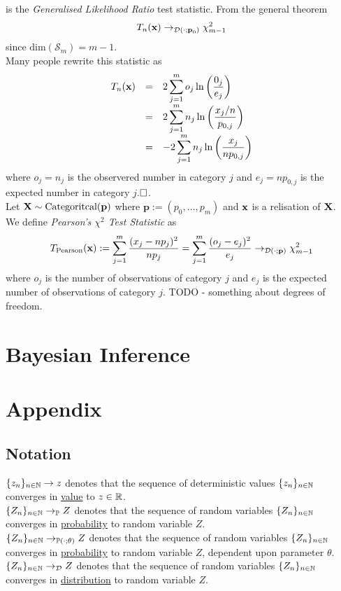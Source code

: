 \documentclass[11pt,a4paper]{article}
\begin{document}
is the \textit{Generalised Likelihood Ratio} test statistic. From the general theorem
$$T_n(\textbf{x})\to_{\mathcal{D}(\cdot;\textbf{p}_0)}\chi^2_{m-1}$$
since $\text{dim}(\mathcal{S}_m)=m-1$.\\
Many people rewrite this statistic as
\[\begin{array}{rcl}
T_n(\textbf{x})&=&{\displaystyle2\sum_{j=1}^mo_j\ln\left(\frac{0_j}{e_j}\right)}\\
&=&{\displaystyle2\sum_{j=1}^mn_j\ln\left(\frac{x_j/n}{p_{0,j}}\right)}\\
&=&{\displaystyle-2\sum_{j=1}^mn_j\ln\left(\frac{x_j}{np_{0,j}}\right)}
\end{array}\]
where $o_j=n_j$ is the observered number in category $j$ and $e_j=np_{0,j}$ is the expected number in category $j$.$\hfill\square$.\\

Let $\textbf{X}\sim\text{Categoritcal}(\textbf{p})$ where $\textbf{p}:=(p_0,\dots,p_m)$ and $\textbf{x}$ is a relisation of $\textbf{X}$.\\
We define \textit{Pearson's $\chi^2$ Test Statistic}  as
$$T_\text{Pearson}(\textbf{x}):=\sum_{j=1}^m\frac{(x_j-np_{j})^2}{np_{j}}=\sum_{j=1}^m\frac{(o_j-e_j)^2}{e_j}\to_{\mathcal{D}(\cdot;\textbf{p})}\chi^2_{m-1}$$
where $o_j$ is the number of observations of category $j$ and $e_j$ is the expected number of observations of category $j$.
\nb TODO - something about degrees of freedom.\\

\section{Bayesian Inference}

\newpage
\setcounter{section}{-1}
\section{Appendix}

\subsection{Notation}

$\{z_n\}_{n\in\mathbb{N}}\to z$ denotes that the sequence of deterministic values $\{z_n\}_{n\in\mathbb{N}}$ converges in \underline{value} to $z\in\mathbb{R}$.\\
$\{Z_n\}_{n\in\mathbb{N}}\to_{\mathbb{P}} Z$ denotes that the sequence of random variables $\{Z_n\}_{n\in\mathbb{N}}$ converges in \underline{probability} to random variable $Z$.\\
$\{Z_n\}_{n\in\mathbb{N}}\to_{\mathbb{P}(\cdot;\theta)} Z$ denotes that the sequence of random variables $\{Z_n\}_{n\in\mathbb{N}}$ converges in \underline{probability} to random variable $Z$, dependent upon parameter $\theta$.\\
$\{Z_n\}_{n\in\mathbb{N}}\to_\mathcal{D} Z$ denotes that the sequence of random variables $\{Z_n\}_{n\in\mathbb{N}}$ converges in \underline{distribution} to random variable $Z$.\\
\end{document}
